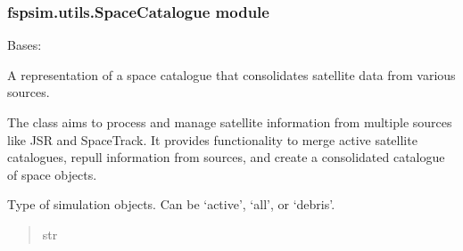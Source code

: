 \documentclass[letterpaper,10pt,english]{sphinxmanual}
\begin{document}
\subsubsection{fspsim.utils.SpaceCatalogue module}
\label{\detokenize{fspsim.utils:module-fspsim.utils.SpaceCatalogue}}\label{\detokenize{fspsim.utils:fspsim-utils-spacecatalogue-module}}

\begin{fulllineitems}
\label{\detokenize{fspsim.utils:fspsim.utils.SpaceCatalogue.SpaceCatalogue}}
\pysigstartsignatures
{}
\pysigstopsignatures
\sphinxAtStartPar
Bases: 

\sphinxAtStartPar
A representation of a space catalogue that consolidates satellite data from various sources.

\sphinxAtStartPar
The class aims to process and manage satellite information from multiple sources like JSR and SpaceTrack.
It provides functionality to merge active satellite catalogues, repull information from sources,
and create a consolidated catalogue of space objects.

\begin{fulllineitems}
\label{\detokenize{fspsim.utils:fspsim.utils.SpaceCatalogue.SpaceCatalogue.sim_object_type}}
\pysigstartsignatures
{}
\pysigstopsignatures
\sphinxAtStartPar
Type of simulation objects. Can be ‘active’, ‘all’, or ‘debris’.
\begin{quote}\begin{description}
\sphinxAtStartPar
str

\end{description}\end{quote}


\end{fulllineitems}
\end{fulllineitems}
\end{document}
